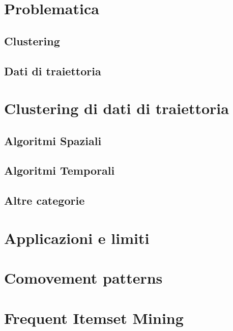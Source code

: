 
\section{Problematica}\label{sec:problem}


\subsection{Clustering}\label{subsec:problem:clustering}


\subsection{Dati di traiettoria}\label{subsec:problem:trajectorydata}


\section{Clustering di dati di traiettoria}\label{sec:problem:trajectoryclustering}


\subsection{Algoritmi Spaziali}\label{subsec:categories:spatialalgorithms}


\subsection{Algoritmi Temporali}\label{subsec:categories:temporalalgorithms}

\subsection{Altre categorie}\label{subsec:categories:othersalgorithms}

\section{Applicazioni e limiti}\label{sec:applicationandlimits}

\section{Comovement patterns}\label{sec:comovements-pattern}

\section{Frequent Itemset Mining}\label{sec:frequent-itemset-mining}

